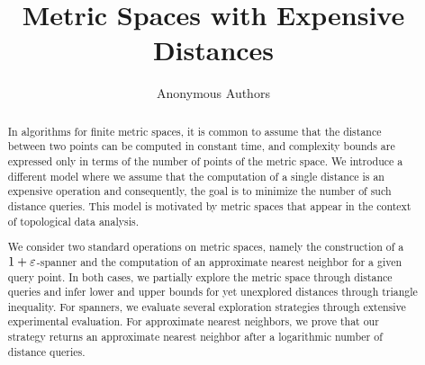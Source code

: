 \documentclass[a4paper,UKenglish,cleveref, autoref]{lipics-v2019}
\title{Metric Spaces with Expensive Distances}
\author{Anonymous Authors}{Anon}{}{}{}
\begin{document}
\maketitle

\begin{abstract}
In algorithms for finite metric spaces, it is common
to assume that the distance between two points
can be computed in constant time, and complexity
bounds are expressed only in terms of the number
of points of the metric space.
We introduce a different model where we assume
that the computation of a single distance is
an expensive operation and consequently, the goal is
to minimize the number of such distance queries.
This model is motivated by metric spaces
that appear in the context of topological data analysis.

We consider two standard operations on metric spaces,
namely the construction of a $1+\varepsilon$-spanner
and the computation of an approximate nearest
neighbor for a given query point.
In both cases, we partially explore the metric space
through distance queries and infer lower and upper bounds
for yet unexplored distances through triangle inequality.
For spanners, we evaluate several exploration strategies
through extensive experimental evaluation.
For approximate nearest neighbors, we prove that our
strategy returns an approximate nearest neighbor
after a logarithmic number of distance queries.
\end{abstract}




\end{document}
